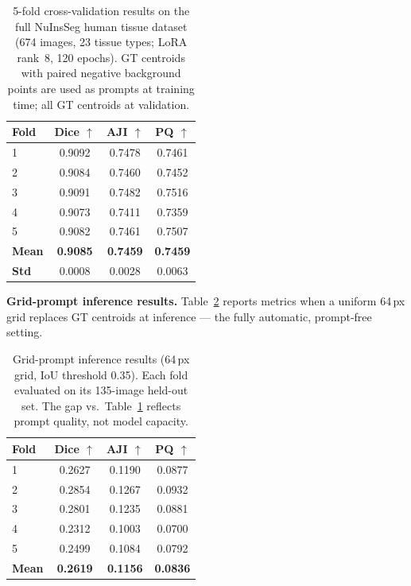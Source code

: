 \documentclass[10pt,twocolumn]{article}
\begin{document}
\begin{table}[h]
\centering
\caption{5-fold cross-validation results on the full NuInsSeg
human tissue dataset (674 images, 23 tissue types; LoRA rank~8,
120 epochs). GT centroids with paired negative background points
are used as prompts at training time; all GT centroids at validation.}
\label{tab:results}
\small
\setlength{\tabcolsep}{5pt}
\begin{tabular}{lccc}
\toprule
\textbf{Fold} &
\textbf{Dice $\uparrow$} &
\textbf{AJI $\uparrow$} &
\textbf{PQ $\uparrow$} \\
\midrule
1 & 0.9092 & 0.7478 & 0.7461 \\
2 & 0.9084 & 0.7460 & 0.7452 \\
3 & 0.9091 & 0.7482 & 0.7516 \\
4 & 0.9073 & 0.7411 & 0.7359 \\
5 & 0.9082 & 0.7461 & 0.7507 \\
\midrule
\textbf{Mean} &
\textbf{0.9085} & \textbf{0.7459} & \textbf{0.7459} \\
\textbf{Std}  &
0.0008 & 0.0028 & 0.0063 \\
\bottomrule
\end{tabular}
\end{table}

\textbf{Grid-prompt inference results.}
Table~\ref{tab:eval} reports metrics when a uniform 64\,px
grid replaces GT centroids at inference --- the fully automatic,
prompt-free setting.

\begin{table}[h]
\centering
\caption{Grid-prompt inference results (64\,px grid, IoU
threshold 0.35). Each fold evaluated on its 135-image
held-out set. The gap vs.\ Table~\ref{tab:results} reflects
prompt quality, not model capacity.}
\label{tab:eval}
\small
\setlength{\tabcolsep}{5pt}
\begin{tabular}{lccc}
\toprule
\textbf{Fold} &
\textbf{Dice $\uparrow$} &
\textbf{AJI $\uparrow$} &
\textbf{PQ $\uparrow$} \\
\midrule
1 & 0.2627 & 0.1190 & 0.0877 \\
2 & 0.2854 & 0.1267 & 0.0932 \\
3 & 0.2801 & 0.1235 & 0.0881 \\
4 & 0.2312 & 0.1003 & 0.0700 \\
5 & 0.2499 & 0.1084 & 0.0792 \\
\midrule
\textbf{Mean} & \textbf{0.2619} & \textbf{0.1156} & \textbf{0.0836} \\
\bottomrule
\end{tabular}
\end{table}
\end{document}
